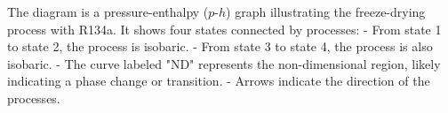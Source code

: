 The diagram is a pressure-enthalpy (\(p\)-\(h\)) graph illustrating the freeze-drying process with R134a. It shows four states connected by processes:  
- From state 1 to state 2, the process is isobaric.  
- From state 3 to state 4, the process is also isobaric.  
- The curve labeled "ND" represents the non-dimensional region, likely indicating a phase change or transition.  
- Arrows indicate the direction of the processes.
